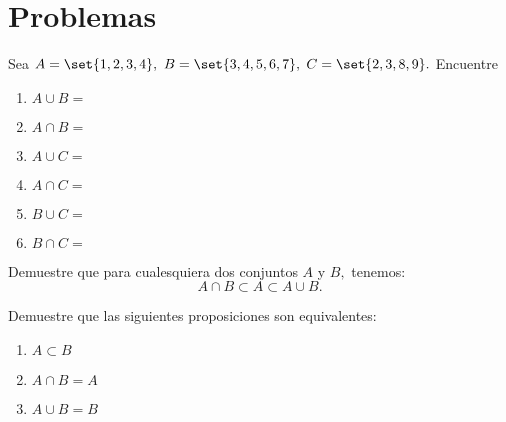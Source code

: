 \section*{Problemas}


\begin{problema}
	\label{lip:exmp:1.4.a}
	Sea $A=\set{1,2,3,4},$ $B=\set{3,4,5,6,7},$ $C=\set{2,3,8,9}.$ Encuentre 
	\begin{enumerate}
		\item $A \cup B=$ 
		\item $A \cap B=$ 
		\item $A \cup C=$ 
		\item $A \cap C=$ 
		\item $B \cup C=$ 
		\item $B \cap C=$
	\end{enumerate}
	
\end{problema}


\begin{problema}
	\label{thm:1.3}
	Demuestre que para cualesquiera dos conjuntos $A$ y $B,$ tenemos:
	$$
	A \cap B \subset A \subset A \cup B.
	$$
\end{problema}




\begin{problema}
	\label{thm:1.4}
	Demuestre que las siguientes proposiciones son equivalentes:
	\begin{enumerate}
		\item $\displaystyle A \subset B$
		\item $\displaystyle A \cap B = A$
		\item $\displaystyle A \cup B = B$
	\end{enumerate}
	
\end{problema}


